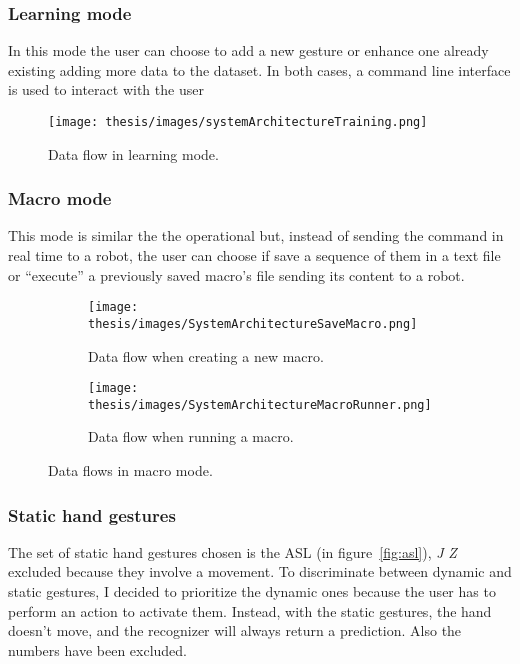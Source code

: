 \documentclass[../thesis.tex]{subfiles}
\begin{document}
\subsubsection{Learning mode}
In this mode the user can choose to add a new gesture or enhance one already existing adding more data to the dataset. In both cases, a command line interface is used to interact with the user
\begin{figure}[H]
    \centering
    \texttt{[image: thesis/images/systemArchitectureTraining.png]}
    \caption{Data flow in learning mode.}
    \label{fig:system_architecture_learning}
\end{figure}

\subsubsection{Macro mode}
 This mode is similar the the operational but, instead of sending the command in real time to a robot, the user can choose if save a sequence of them in a text file or ``execute'' a previously saved macro's file sending its content to a robot.
\begin{figure}[H]
    \centering

    \begin{subfigure}{\textwidth}
        \texttt{[image: thesis/images/SystemArchitectureSaveMacro.png]}
        \caption{Data flow when creating a new macro.}
        \label{fig:system_architecture_save_macro}
    \end{subfigure}
    \hfill
    \begin{subfigure}{\textwidth}
        \texttt{[image: thesis/images/SystemArchitectureMacroRunner.png]}
        \caption{Data flow when running a macro.}
        \label{fig:system_architecture_run_macro}
    \end{subfigure}
    
    \caption{Data flows in macro mode.}
    \label{fig:data_flows}
\end{figure}

\subsubsection{Static hand gestures}
The set of static hand gestures chosen is the \gls{ASL} (in figure~\ref{fig:asl}), \textit{J} \textit{Z} excluded because they involve a movement. To discriminate between dynamic and static gestures, I decided to prioritize the dynamic ones because the user has to perform an action to activate them. Instead, with the static gestures, the hand doesn't move, and the recognizer will always return a prediction. Also the numbers have been excluded.
\end{document}
